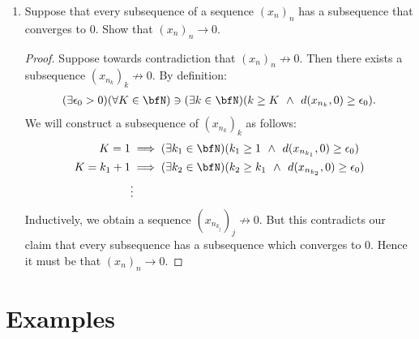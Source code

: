 \begin{enumerate}[label = (\arabic*)]
        \item Suppose that every subsequence of a sequence $(x_n)_n$ has a subsequence that converges to $0$. Show that $(x_n)_n \rightarrow 0$.
            {\color{red} \begin{proof}
                Suppose towards contradiction that $(x_n)_n \not\rightarrow 0$. Then there exists a subsequence $(x_{n_k})_k \not\rightarrow 0$. By definition:
                    \begin{equation*}
                    \begin{split}
                        (\exists \epsilon_0 > 0)(\forall K \in \bfN) \ni (\exists k \in \bfN)(k \geq K \hspace{4pt}\land \hspace{4pt} d(x_{n_k} , 0) \geq \epsilon_0).
                    \end{split}
                    \end{equation*}
                We will construct a subsequence of $(x_{n_k})_k$ as follows:
                    \begin{equation*}
                    \begin{split}
                        K = 1 &\implies (\exists k_1 \in \bfN)(k_1 \geq 1 \hspace{4pt}\land\hspace{4pt} d(x_{n_{k_1}}, 0) \geq \epsilon_0) \\
                        K = k_1 + 1 &\implies (\exists k_2 \in \bfN)(k_2 \geq k_1 \hspace{4pt}\land\hspace{4pt} d(x_{n_{k_2}}, 0) \geq \epsilon_0) \\
                        &\vdots 
                    \end{split}
                    \end{equation*}
                Inductively, we obtain a sequence $(x_{n_{k_j}})_j \not\rightarrow 0$. But this contradicts our claim that every subsequence has a subsequence which converges to $0$. Hence it must be that $(x_n)_n \rightarrow 0$.
            \end{proof}}
    \end{enumerate}
\section*{Examples}